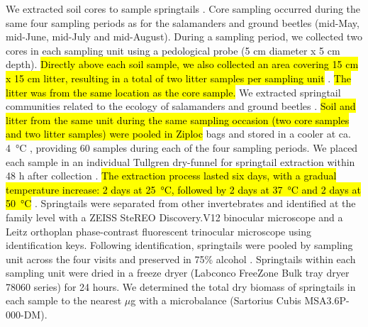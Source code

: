 We extracted soil cores to sample springtails \citep{pongeVerticalDistributionCollembola2000,salamonEffectsPlantDiversity2004,chauvatChangesSoilFaunal2011a,farskaManagementIntensityAffects2014}. 
Core sampling occurred during the same four sampling periods as for the salamanders and ground beetles (mid-May, mid-June, mid-July and mid-August). 
During a sampling period, we collected two cores in each sampling unit using a pedological probe (5 cm diameter x 5 cm depth). 
\hl{Directly above each soil sample, we also collected an area covering 15 cm x 15 cm litter, resulting in a total of two litter samples per sampling unit} \citep{raymond-leonardSpringtailCommunityStructure2018a,rousseauForestFloorMesofauna2018}. 
\hl{The litter was from the same location as the core sample.} 
We extracted springtail communities related to the ecology of salamanders and ground beetles \citep{edwardsAssessmentPopulationsSoilinhabiting1991,chauvatChangesSoilFaunal2011a,raymond-leonardSpringtailCommunityStructure2018a,rousseauForestFloorMesofauna2018}. 
\hl{Soil and litter from the same unit during the same sampling occasion (two core samples and two litter samples) were pooled in Ziploc}\up{\texttrademark{}} bags and stored in a cooler at ca. 4 °C \citep{chauvatChangesSoilFaunal2011a,rousseauForestFloorMesofauna2018}, providing 60 samples during each of the four sampling periods. 
We placed each sample in an individual Tullgren dry-funnel for springtail extraction within 48 h after collection \citep{rusekBiodiversityCollembolaTheir1998,wuCompositionSpatiotemporalVariation2014,rousseauForestFloorMesofauna2018}. 
\hl{The extraction process lasted six days, with a gradual temperature increase: 2 days at 25 °C, followed by 2 days at 37 °C and 2 days at 50 °C} \citep{raymond-leonardSpringtailCommunityStructure2018a}. 
Springtails were separated from other invertebrates and identified at the family level with a ZEISS SteREO Discovery.V12 binocular microscope and a Leitz orthoplan phase-contrast fluorescent trinocular microscope using \cite{bellingerChecklistCollembolaWorld1996} identification keys. 
Following identification, springtails were pooled by sampling unit across the four visits and preserved in 75\% alcohol \citep{wuCompositionSpatiotemporalVariation2014}. 
Springtails within each sampling unit were dried in a freeze dryer (Labconco FreeZone Bulk tray dryer 78060 series) for 24 hours. 
We determined the total dry biomass of springtails in each sample to the nearest $\mu$g with a microbalance (Sartorius Cubis\up{\texttrademark{}} MSA3.6P-000-DM).

